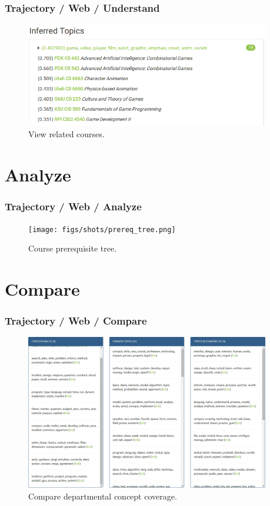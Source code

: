 \documentclass[10pt, compress]{beamer}
\begin{document}
\begin{frame}
  \frametitle{Trajectory / Web / Understand}
  \begin{figure}
    \centering
    \includegraphics[width=0.95\textwidth]{figs/shots/related_game_design.png}
    \caption{View related courses.}
  \end{figure}
\end{frame}

\section{Analyze}

\begin{frame}
  \frametitle{Trajectory / Web / Analyze}
  \begin{figure}
    \centering
    \texttt{[image: figs/shots/prereq\_tree.png]}
    \caption{Course prerequisite tree.}
  \end{figure}
\end{frame}

\section{Compare}

\begin{frame}
  \frametitle{Trajectory / Web / Compare}
  \begin{figure}
    \centering
    \includegraphics[width=0.95\textwidth]{figs/shots/compare.png}
    \caption{Compare departmental concept coverage.}
  \end{figure}
\end{frame}
\end{document}
